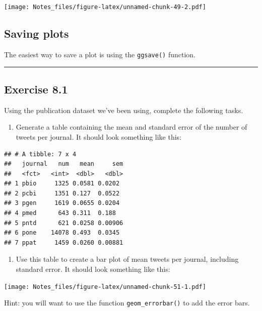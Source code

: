 \documentclass[
]{book}
\providecommand{\tightlist}{%
  \setlength{\itemsep}{0pt}\setlength{\parskip}{0pt}}
\begin{document}
\texttt{[image: Notes\_files/figure-latex/unnamed-chunk-49-2.pdf]}

\hypertarget{saving-plots}{%
\subsection{Saving plots}\label{saving-plots}}

The easiest way to save a plot is using the \texttt{ggsave()} function.

\begin{center}\rule{0.5\linewidth}{0.5pt}\end{center}

\hypertarget{exercise-8.1}{%
\subsection*{Exercise 8.1}\label{exercise-8.1}}

Using the publication dataset we've been using, complete the following tasks.

\begin{enumerate}
\def\labelenumi{\arabic{enumi}.}
\tightlist
\item
  Generate a table containing the mean and standard error of the number of tweets per journal. It should look something like this:
\end{enumerate}

\begin{verbatim}
## # A tibble: 7 x 4
##   journal   num   mean     sem
##   <fct>   <int>  <dbl>   <dbl>
## 1 pbio     1325 0.0581 0.0202 
## 2 pcbi     1351 0.127  0.0522 
## 3 pgen     1619 0.0655 0.0204 
## 4 pmed      643 0.311  0.188  
## 5 pntd      621 0.0258 0.00906
## 6 pone    14078 0.493  0.0345 
## 7 ppat     1459 0.0260 0.00881
\end{verbatim}

\begin{enumerate}
\def\labelenumi{\arabic{enumi}.}
\setcounter{enumi}{1}
\tightlist
\item
  Use this table to create a bar plot of mean tweets per journal, including standard error. It should look something like this:
\end{enumerate}

\texttt{[image: Notes\_files/figure-latex/unnamed-chunk-51-1.pdf]}

Hint: you will want to use the function \texttt{geom\_errorbar()} to add the error bars.
\end{document}
